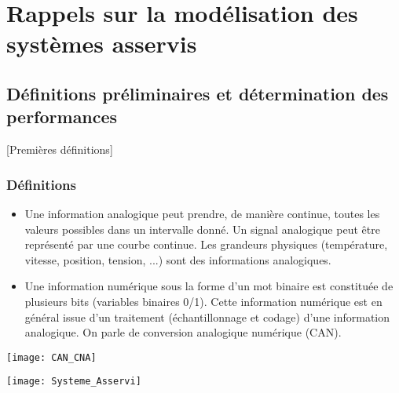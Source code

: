 \setchapterpreamble[u]{\margintoc}

\chapter{Rappels sur la modélisation des systèmes asservis}



\section{Définitions préliminaires et détermination des performances}[Premières définitions]

\subsection{Définitions}


\begin{defi} 

\begin{itemize}%
\item Une information analogique peut prendre, de manière continue, toutes les valeurs
possibles dans un intervalle donné. Un signal analogique peut être représenté
par une courbe continue. Les grandeurs physiques (température, vitesse,
position, tension, ...) sont des informations analogiques.

\item Une information numérique sous la forme d'un mot binaire est constituée de
plusieurs bits (variables binaires 0/1). Cette information numérique est en
général issue d'un traitement (échantillonnage et codage) d'une information
analogique. On parle de conversion analogique numérique (CAN).
\end{itemize}
\end{defi}

\begin{center}
\texttt{[image: CAN\_CNA]}
\end{center}

\begin{marginfigure}[1cm]
\texttt{[image: Systeme\_Asservi]}
\end{marginfigure}


